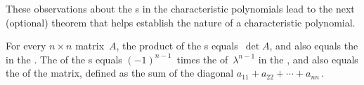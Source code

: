 These observations about the s in the characteristic polynomials lead to the next (optional) theorem that helps establish the nature of a characteristic polynomial.

\begin{theorem} \label{thm:charpolyc}
For every \(n\times n\) matrix~\(A\), the product of the s equals~\(\det A\), and also equals the  in the .  
The  of the s equals \((-1)^{n-1}\)~times the  of~\(\lambda^{n-1}\) in the , and also equals the  of the matrix, defined as the sum of the diagonal  \(a_{11}+a_{22}+\cdots+a_{nn}\)\,.
\end{theorem}

